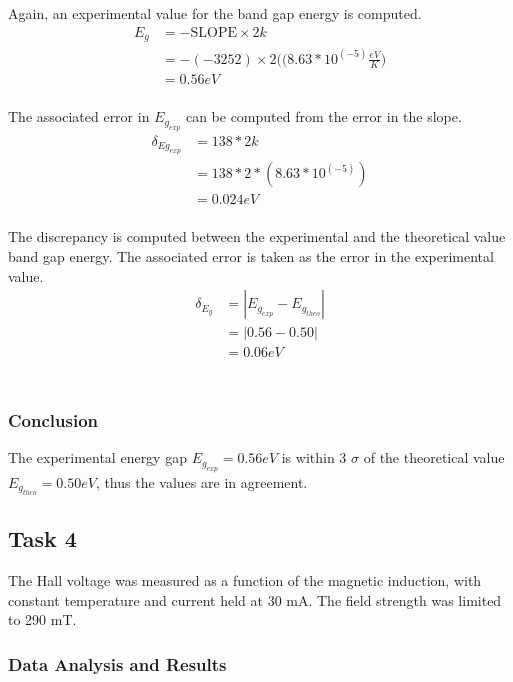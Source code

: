 \documentclass[a4paper]{article}
\begin{document}
Again, an experimental value for the band gap energy is computed.
\begin{align*}
E_g &= - \text{SLOPE} \times 2k \\
    &= - (-3252) \times 2 
       \Big( (8.63 *10^(-5) \frac{eV}{K} \Big) \\
    &= 0.56 eV \\
\end{align*}

The associated error in $E_{g_{exp}}$ can be computed from the error in the slope.
\begin{align*}
\delta_{Eg_{exp}} &= {138}*{2k} \\
                  &= {138}*{2*(8.63 *10^(-5))} \\
                  &= 0.024 eV \\
\end{align*}

\qq The discrepancy is computed between the experimental and the
theoretical value band gap energy. The associated error is taken as
the error in the experimental value.
\begin{align*}
\delta_{E_g} &= | E_{g_{exp}} - E_{g_{theo}} | \\
		     &= | 0.56 - 0.50| \\
		     &= 0.06 eV \\
\end{align*}\\

\subsubsection{Conclusion}
\qq The experimental energy gap $E_{g_{exp}} = 0.56 eV$ is within
3 $\sigma$ of the theoretical value $E_{g_{theo}} = 0.50  eV$,
thus the values are in agreement.

\subsection{Task 4}

\qq The Hall voltage was measured as a function of the magnetic
induction, with constant temperature and current held at 30 mA. 
The field strength was limited to 290 mT. 

\subsubsection{Data Analysis and Results}
\end{document}
